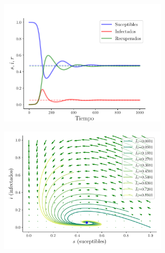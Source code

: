 \documentclass[twocolumn,aps,prl]{revtex4-1}
\begin{document}
\begin{figure}[ht!]
  \begin{subfigure}[b]{0.49\linewidth}
    \centering
      \centering
      \includegraphics[width = 0.9\textwidth]{figuras/ex01-a-sir.pdf}
      \caption{}
      \label{fig:figuras/ex01-a-sir}
  \end{subfigure}\quad
  \begin{subfigure}[b]{0.49\linewidth}
      \centering
      \includegraphics[width = 0.9\textwidth]{figuras/ex01-a-vector.pdf}
      \caption{}
      \label{fig:figuras/ex01-a-vector}
  \end{subfigure}\quad


\end{figure}
\end{document}
